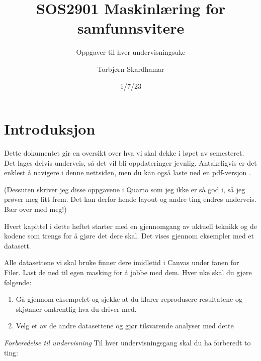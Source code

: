 \documentclass[
  letterpaper,
  DIV=11,
  numbers=noendperiod]{scrreprt}
\title{SOS2901 Maskinlæring for samfunnsvitere}
\subtitle{Oppgaver til hver undervisningsuke}
\author{Torbjørn Skardhamar}
\date{1/7/23}
\providecommand{\tightlist}{%
  \setlength{\itemsep}{0pt}\setlength{\parskip}{0pt}}\usepackage{longtable,booktabs,array}
\renewcommand*\contentsname{Table of contents}
\newcommand\contentsname{Table of contents}
\theoremstyle{definition}
\theoremstyle{remark}
\begin{document}
\maketitle
\ifdefined\Shaded\renewenvironment{Shaded}{\begin{tcolorbox}[borderline west={3pt}{0pt}{shadecolor}, frame hidden, boxrule=0pt, sharp corners, interior hidden, breakable, enhanced]}{\end{tcolorbox}}\fi

\renewcommand*\contentsname{Table of contents}
{
\hypersetup{linkcolor=}
\setcounter{tocdepth}{2}
\tableofcontents
}

\hypertarget{introduksjon}{%
\chapter*{Introduksjon}\label{introduksjon}}


Dette dokumentet gir en oversikt over hva vi skal dekke i løpet av
semesteret. Det lages delvis underveis, så det vil bli oppdateringer
jevnlig. Antakeligvis er det enklest å navigere i denne nettsiden, men
du kan også laste ned en pdf-versjon .

(Dessuten skriver jeg disse oppgavene i Quarto som jeg ikke er så god i,
så jeg prøver meg litt frem. Det kan derfor hende layout og andre ting
endres underveis. Bær over med meg!)

Hvert kapittel i dette heftet starter med en gjennomgang av aktuell
teknikk og de kodene som trengs for å gjøre det dere skal. Det vises
gjennom eksempler med et datasett.

Alle datasettene vi skal bruke finner dere imidletid i Canvas under
fanen for Filer. Last de ned til egen masking for å jobbe med dem. Hver
uke skal du gjøre følgende:

\begin{enumerate}
\def\labelenumi{\arabic{enumi})}
\tightlist
\item
  Gå gjennom eksempelet og sjekke at du klarer reprodusere resultatene
  og skjønner omtrentlig hva du driver med.
\item
  Velg et av de andre datasettene og gjør tilsvarende analyser med dette
\end{enumerate}

\emph{Forberedelse til undervisning} Til hver undervisningsgang skal du
ha forberedt to ting:
\end{document}
